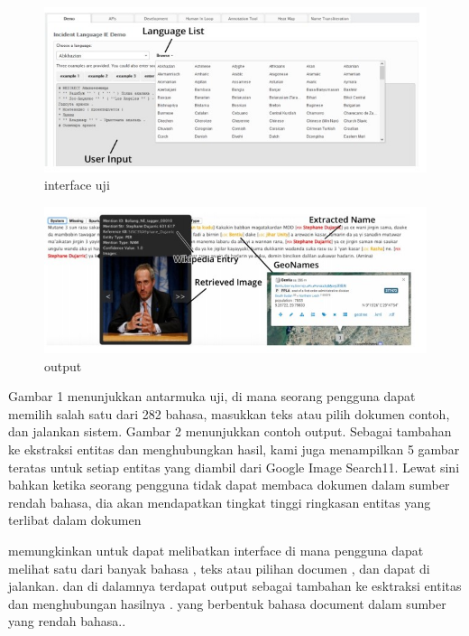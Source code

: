 \begin{figure}[ht]
\centerline{\includegraphics[width=1\textwidth]{figures/5satu.JPG}}
\caption{interface uji}
\label{gambarPFS2}
\end{figure}

\begin{figure}[ht]
\centerline{\includegraphics[width=1\textwidth]{figures/5dua.JPG}}
\caption{output}
\label{gambarPFS3}
\end{figure}

Gambar 1 menunjukkan antarmuka uji, di mana seorang pengguna dapat memilih salah satu dari 282 bahasa, masukkan teks atau pilih dokumen contoh, dan jalankan sistem. Gambar 2 menunjukkan contoh output. Sebagai tambahan ke ekstraksi entitas dan menghubungkan hasil, kami juga menampilkan 5 gambar teratas untuk setiap entitas yang diambil dari Google Image Search11. Lewat sini bahkan ketika seorang pengguna tidak dapat membaca dokumen dalam sumber rendah bahasa, dia akan mendapatkan tingkat tinggi ringkasan entitas yang terlibat dalam dokumen

memungkinkan untuk dapat melibatkan interface di mana pengguna dapat melihat satu dari banyak bahasa , teks atau pilihan documen , dan dapat di jalankan. dan di dalamnya terdapat output sebagai tambahan ke esktraksi entitas dan menghubungan hasilnya . yang berbentuk bahasa document dalam sumber yang rendah bahasa.\cite{zhangelisa}.

